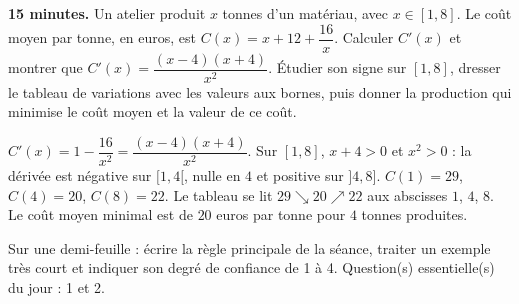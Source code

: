 \begin{homework}\textbf{15 minutes.} Un atelier produit $x$ tonnes d'un matériau, avec $x\in[1,8]$. Le coût moyen par tonne, en euros, est $C(x)=x+12+\dfrac{16}{x}$. Calculer $C'(x)$ et montrer que $C'(x)=\dfrac{(x-4)(x+4)}{x^2}$. Étudier son signe sur $[1,8]$, dresser le tableau de variations avec les valeurs aux bornes, puis donner la production qui minimise le coût moyen et la valeur de ce coût.\end{homework}
\begin{solution}$C'(x)=1-\dfrac{16}{x^2}=\dfrac{(x-4)(x+4)}{x^2}$. Sur $[1,8]$, $x+4>0$ et $x^2>0$ : la dérivée est négative sur $[1,4[$, nulle en $4$ et positive sur $]4,8]$. $C(1)=29$, $C(4)=20$, $C(8)=22$. Le tableau se lit $29\searrow20\nearrow22$ aux abscisses $1$, $4$, $8$. Le coût moyen minimal est de $20$ euros par tonne pour $4$ tonnes produites.\end{solution}

\begin{exitticket}[3 minutes]Sur une demi-feuille : écrire la règle principale de la séance, traiter un exemple très court et indiquer son degré de confiance de 1 à 4. Question(s) essentielle(s) du jour : 1 et 2.\end{exitticket}


